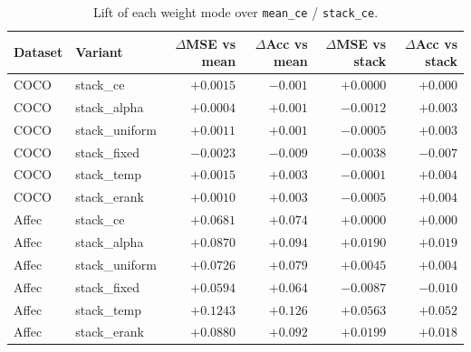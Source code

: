 \begin{table}[t]
\centering
\caption{Lift of each weight mode over \texttt{mean\_ce} / \texttt{stack\_ce}.}
\label{tab:agod-weight-sweep-lift}
\begin{tabular}{llrrrr}
\toprule
Dataset & Variant & $\Delta$MSE vs mean & $\Delta$Acc vs mean & $\Delta$MSE vs stack & $\Delta$Acc vs stack \\
\midrule
COCO  & stack\_ce        & $+0.0015$ & $-0.001$ & $+0.0000$ & $+0.000$ \\
COCO  & stack\_alpha     & $+0.0004$ & $+0.001$ & $-0.0012$ & $+0.003$ \\
COCO  & stack\_uniform   & $+0.0011$ & $+0.001$ & $-0.0005$ & $+0.003$ \\
COCO  & stack\_fixed     & $-0.0023$ & $-0.009$ & $-0.0038$ & $-0.007$ \\
COCO  & stack\_temp      & $+0.0015$ & $+0.003$ & $-0.0001$ & $+0.004$ \\
COCO  & stack\_erank     & $+0.0010$ & $+0.003$ & $-0.0005$ & $+0.004$ \\
\midrule
Affec & stack\_ce        & $+0.0681$ & $+0.074$ & $+0.0000$ & $+0.000$ \\
Affec & stack\_alpha     & $+0.0870$ & $+0.094$ & $+0.0190$ & $+0.019$ \\
Affec & stack\_uniform   & $+0.0726$ & $+0.079$ & $+0.0045$ & $+0.004$ \\
Affec & stack\_fixed     & $+0.0594$ & $+0.064$ & $-0.0087$ & $-0.010$ \\
Affec & stack\_temp      & $+0.1243$ & $+0.126$ & $+0.0563$ & $+0.052$ \\
Affec & stack\_erank     & $+0.0880$ & $+0.092$ & $+0.0199$ & $+0.018$ \\
\bottomrule
\end{tabular}
\end{table}
